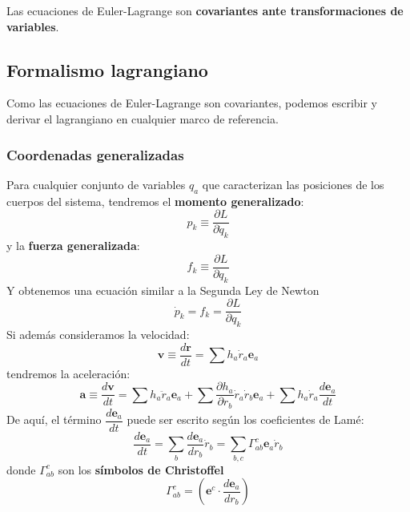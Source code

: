\documentclass[]{article}
\numberwithin{equation}{section}
\begin{document}
Las ecuaciones de Euler-Lagrange son \textbf{covariantes ante transformaciones de variables}.

\subsection{Formalismo lagrangiano}
Como las ecuaciones de Euler-Lagrange son covariantes, podemos escribir y derivar el lagrangiano en cualquier marco de referencia.

\subsubsection{Coordenadas generalizadas}
Para cualquier conjunto de variables \({q_a}\) que caracterizan las posiciones de los cuerpos del sistema, tendremos el \textbf{momento generalizado}:
\begin{equation}
	p_k \equiv \frac{\partial L}{\partial \dot{q}_k}
\end{equation}
y la \textbf{fuerza generalizada}:
\begin{equation}
	f_k \equiv \frac{\partial L}{\partial q_k}
\end{equation}
Y obtenemos una ecuación similar a la Segunda Ley de Newton
\begin{equation}
	\dot{p}_k = f_k = \frac{\partial L}{\partial q_k}
\end{equation}
Si además consideramos la velocidad:
\begin{equation}
	\mathbf{v} \equiv \frac{d \mathbf{r}}{dt} = \sum h_a \dot{r}_a \mathbf{e}_a
\end{equation}
tendremos la aceleración:
\begin{equation}
	\mathbf{a} \equiv \frac{d \mathbf{v}}{dt} = \sum h_a\ddot{r}_a\mathbf{e}_a + \sum \frac{\partial h_a}{\partial r_b}\dot{r}_a\dot{r}_b\mathbf{e}_a + \sum h_a\dot{r}_a\frac{d\mathbf{e}_a}{dt}
\end{equation}
De aquí, el término \(\dfrac{d\mathbf{e}_a}{dt}\) puede ser escrito según los coeficientes de Lamé:
\begin{equation}
	\frac{d\mathbf{e}_a}{dt} = \sum_{b}\frac{d\mathbf{e}_a}{dr_b}\dot{r}_b = \sum_{b,c} \Gamma^{c}_{ab} \mathbf{e}_a \dot{r}_b
\end{equation}
donde \(\Gamma^{c}_{ab}\) son los \textbf{símbolos de Christoffel}
\begin{equation}
	\Gamma^{c}_{ab} = \left(\mathbf{e}^c \cdot \frac{d\mathbf{e}_a}{dr_b}\right) \label{christoffel}
\end{equation}
\end{document}

